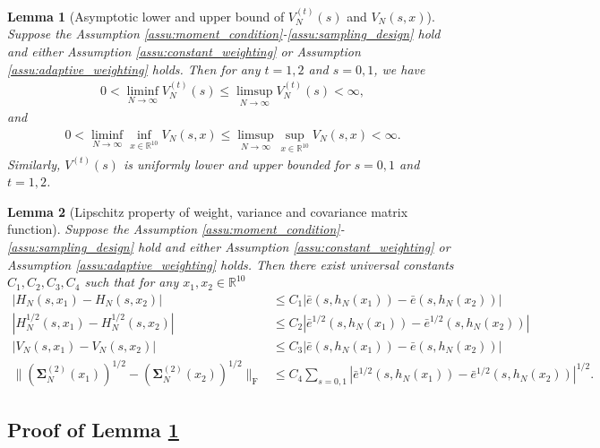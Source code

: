 \documentclass[12pt]{article}
\newtheorem{lemma}{Lemma}
\begin{document}
\begin{lemma}[Asymptotic lower and upper bound of $V_N^{(t)}(s)$ and $V_N(s,x)$]\label{lem:uniform_lower_upper_bound_variance}
	Suppose the Assumption \ref{assu:moment_condition}-\ref{assu:sampling_design} hold and either Assumption \ref{assu:constant_weighting} or Assumption \ref{assu:adaptive_weighting} holds. Then for any $t=1,2$ and $s=0,1$, we have 
	\begin{align*}
		0<\liminf_{N\rightarrow\infty}V_{N}^{(t)}(s)\leq \limsup_{N\rightarrow\infty}V_{N}^{(t)}(s)<\infty,
	\end{align*}
	and 
	\begin{align*}
		0<\liminf_{N\rightarrow\infty}\inf_{x\in\mathbb{R}^{10}}V_{N}(s,x)\leq \limsup_{N\rightarrow\infty}\sup_{x\in\mathbb{R}^{10}}V_{N}(s, x)<\infty.
	\end{align*}
	Similarly, $V^{(t)}(s)$ is uniformly lower and upper bounded for $s=0,1$ and $t=1,2$.
\end{lemma}

\begin{lemma}[Lipschitz property of weight, variance and covariance matrix function]\label{lem:continuity_sqrt_sampling_function}
	Suppose the Assumption \ref{assu:moment_condition}-\ref{assu:sampling_design} hold and either Assumption \ref{assu:constant_weighting} or Assumption \ref{assu:adaptive_weighting} holds. Then there exist universal constants $C_1,C_2,C_3,C_4$ such that for any $x_1,x_2\in\mathbb{R}^{10}$
	\begin{align*}
		|H_{N}(s,x_1)-H_{N}(s,x_2)|
		&
		\leq C_1|\bar e(s,h_N(x_1))-\bar e(s,h_N(x_2))|\\
		|H_{N}^{1/2}(s,x_1)-H_{N}^{1/2}(s,x_2)|
		&
		\leq C_2|\bar e^{1/2}(s,h_N(x_1))-\bar e^{1/2}(s,h_N(x_2))|\\
		|V_{N}(s,x_1)-V_{N}(s,x_2)|
		&
		\leq C_3|\bar e(s,h_N(x_1))-\bar e(s,h_N(x_2))|\\
		\|(\bm\Sigma_{N}^{(2)}(x_1))^{1/2}-(\bm\Sigma_{N}^{(2)}(x_2))^{1/2}\|_{\mathrm{F}}
		&
		\leq C_4\sum_{s=0,1}|\bar e^{1/2}(s,h_N(x_1))-\bar e^{1/2}(s,h_N(x_2))|^{1/2}.
	\end{align*}
\end{lemma}


\subsection{Proof of Lemma \ref{lem:uniform_lower_upper_bound_variance}}
\end{document}
